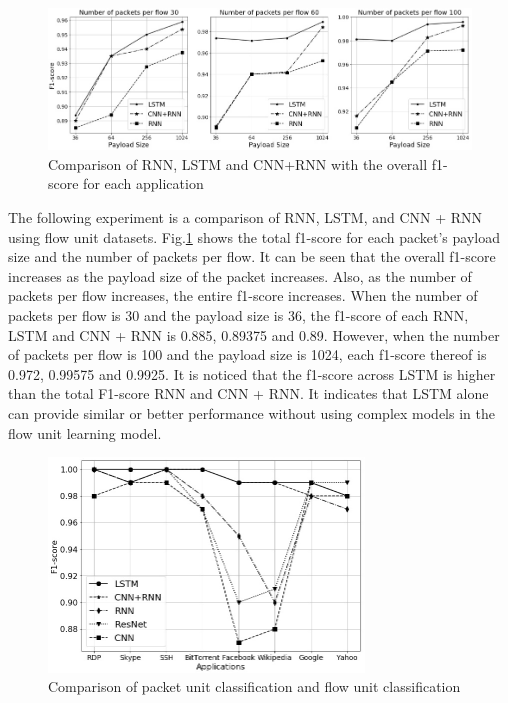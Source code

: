\begin{figure}[h]
\centering
{
\includegraphics[scale=0.5]{fig9.jpg}
\caption{Comparison of RNN, LSTM and CNN+RNN with the overall f1-score for each application}
\label{fig9}
}
\end{figure}

The following experiment is a comparison of RNN, LSTM, and CNN + RNN using flow unit datasets.
Fig.\ref{fig9} shows the total f1-score for each packet's payload size and the number of packets per flow.
It can be seen that the overall f1-score increases as the payload size of the packet increases.
Also, as the number of packets per flow increases, the entire f1-score increases.
When the number of packets per flow is 30 and the payload size is 36, the f1-score of each RNN, LSTM and CNN + RNN is 0.885, 0.89375 and 0.89.
However, when the number of packets per flow is 100 and the payload size is 1024, each f1-score thereof is 0.972, 0.99575 and 0.9925.
It is noticed that the f1-score across LSTM is higher than the total F1-score RNN and CNN + RNN.
It indicates that LSTM alone can provide similar or better performance without using complex models in the flow unit learning model.

\begin{figure}[t]
\centering
{
\includegraphics[width=3.3in]{fig10.jpg}
\caption{Comparison of packet unit classification and flow unit classification}
\label{fig10}
}
\end{figure}

